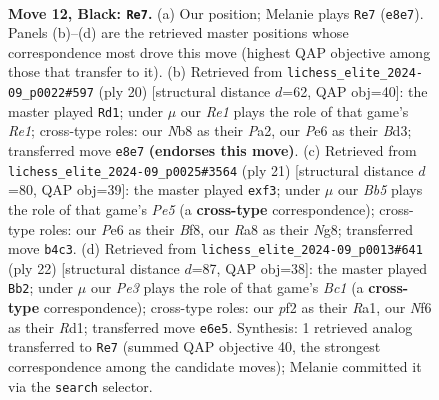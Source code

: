 \documentclass[11pt]{article}
\begin{document}
\clearpage

\begin{figure}[p]\centering
\begin{subfigure}{0.46\textwidth}\centering
\resizebox{\linewidth}{!}{%
\newchessgame
\chessboard[
  setfen={rnb1r1k1/pp1q2pp/2p1pn2/5p2/1bPP4/2N1PNP1/P2B1PBP/R2QR1K1 b - - 2 12},
  showmover=false,
  pgfstyle=straightmove, color=movearrow, markmove={e8-e7}
]}
\caption{}
\end{subfigure}\hfill
\begin{subfigure}{0.46\textwidth}\centering
\resizebox{\linewidth}{!}{%
\newchessgame
\chessboard[
  setfen={r2q1rk1/pbp1bppp/1pn1pn2/8/2PP4/2NB1N2/PP2QPPP/R1B1R1K1 w - - 7 11},
  showmover=false,
  pgfstyle=straightmove, color=movearrow, markmove={e1-d1}
]}
\caption{}
\end{subfigure}
\\[4pt]
\begin{subfigure}{0.46\textwidth}\centering
\resizebox{\linewidth}{!}{%
\newchessgame
\chessboard[
  setfen={1k1r1bnr/pppq2pp/2n2p2/1P3b2/4p3/P1N1PN2/1B1P1PPP/2RQKB1R b K - 0 11},
  showmover=false,
  pgfstyle=straightmove, color=movearrow, markmove={e4-f3}
]}
\caption{}
\end{subfigure}\hfill
\begin{subfigure}{0.46\textwidth}\centering
\resizebox{\linewidth}{!}{%
\newchessgame
\chessboard[
  setfen={r1bq1rk1/1ppp1ppp/p1n1n3/2b1P3/2B5/1PN2N2/P3QPPP/R1BR2K1 w - - 0 12},
  showmover=false,
  pgfstyle=straightmove, color=movearrow, markmove={c1-b2}
]}
\caption{}
\end{subfigure}
\caption{\textbf{Move 12, Black: \texttt{Re7}.} (a) Our position; Melanie plays \texttt{Re7} (\texttt{e8e7}). Panels (b)--(d) are the retrieved master positions whose correspondence most drove this move (highest QAP objective among those that transfer to it). (b) Retrieved from \texttt{lichess\_elite\_2024-09\_p0022\#597} (ply 20) [structural distance $d$=62, QAP obj=40]: the master played \texttt{Rd1}; under $\mu$ our \emph{Re1} plays the role of that game's \emph{Re1}; cross-type roles: our \emph{N}b8 as their \emph{P}a2, our \emph{P}e6 as their \emph{B}d3; transferred move \texttt{e8e7} \textbf{(endorses this move)}. (c) Retrieved from \texttt{lichess\_elite\_2024-09\_p0025\#3564} (ply 21) [structural distance $d$=80, QAP obj=39]: the master played \texttt{exf3}; under $\mu$ our \emph{Bb5} plays the role of that game's \emph{Pe5} (a \textbf{cross-type} correspondence); cross-type roles: our \emph{P}e6 as their \emph{B}f8, our \emph{R}a8 as their \emph{N}g8; transferred move \texttt{b4c3}. (d) Retrieved from \texttt{lichess\_elite\_2024-09\_p0013\#641} (ply 22) [structural distance $d$=87, QAP obj=38]: the master played \texttt{Bb2}; under $\mu$ our \emph{Pe3} plays the role of that game's \emph{Bc1} (a \textbf{cross-type} correspondence); cross-type roles: our \emph{p}f2 as their \emph{R}a1, our \emph{N}f6 as their \emph{R}d1; transferred move \texttt{e6e5}. Synthesis: 1 retrieved analog transferred to \texttt{Re7} (summed QAP objective 40, the strongest correspondence among the candidate moves); Melanie committed it via the \texttt{search} selector.}
\label{fig:thought-m23}
\end{figure}
\end{document}
